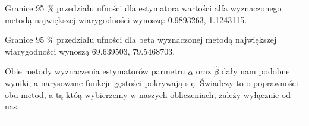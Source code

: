 \documentclass[
]{article}
\begin{document}
Granice 95 \% przedziału ufności dla estymatora wartości alfa
wyznaczonego metodą największej wiarygodności wynoszą: 0.9893263,
1.1243115.

Granice 95 \% przedziału ufności dla beta wyznaczonej metodą największej
wiarygodności wynoszą 69.639503, 79.5468703.

Obie metody wyznaczenia estymatorów parmetru \(\alpha\) oraz
\(\hat{\beta}\) dały nam podobne wyniki, a narysowane funkcje gęstości
pokrywają się. Świadczy to o poprawności obu metod, a tą któą wybierzemy
w naszych obliczeniach, zależy wyłącznie od nas.

\begin{center}\rule{0.5\linewidth}{0.5pt}\end{center}
\end{document}
